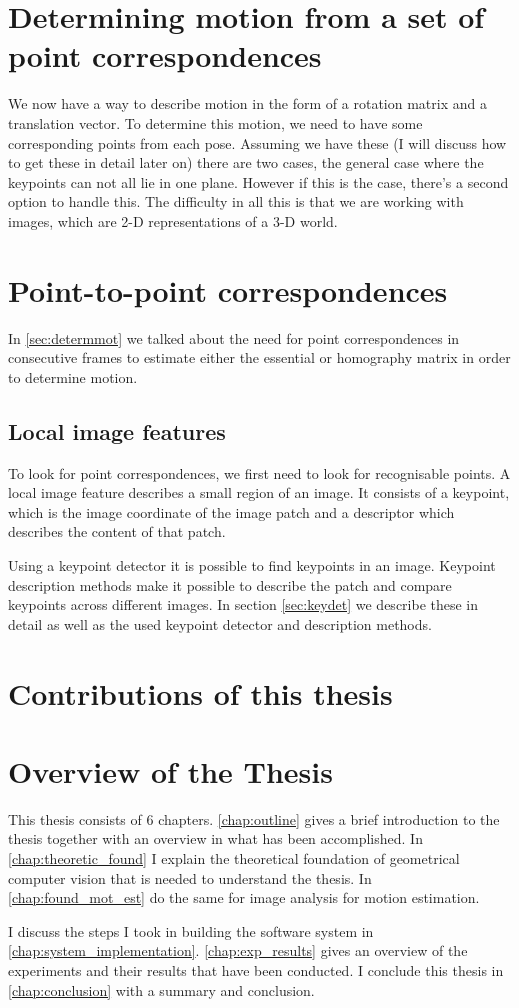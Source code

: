 \section{Determining motion from a set of point correspondences}\label{sec:determmot}
We now have a way to describe motion in the form of a rotation matrix and a translation vector. To determine this motion, we need to have some corresponding points from each pose. Assuming we have these (I will discuss how to get these in detail later on) there are two cases, the general case where the keypoints can not all lie in one plane. However if this is the case, there's a second option to handle this. The difficulty in all this is that we are working with images, which are 2-D representations of a 3-D world. 


\section{Point-to-point correspondences}
In \autoref{sec:determmot} we talked about the need for point correspondences in consecutive frames to estimate either the essential or homography matrix in order to determine motion.\bigskip

\subsection{Local image features}
To look for point correspondences, we first need to look for recognisable points. A local image feature describes a small region of an image. It consists of a keypoint, which is the image coordinate of the image patch and a descriptor which describes the content of that patch.\bigskip

Using a keypoint detector it is possible to find keypoints in an image. Keypoint description methods make it possible to describe the patch and compare keypoints across different images. In section \autoref{sec:keydet} we describe these in detail as well as the used keypoint detector and description methods.

\section{Contributions of this thesis}

\section{Overview of the Thesis}
This thesis consists of 6 chapters. \autoref{chap:outline} gives a brief introduction to the thesis together with an overview in what has been accomplished. In \autoref{chap:theoretic_found} I explain the theoretical foundation of geometrical computer vision that is needed to understand the thesis. In \autoref{chap:found_mot_est} do the same for image analysis for motion estimation.\bigskip

I discuss the steps I took in building the software system in \autoref{chap:system_implementation}. \autoref{chap:exp_results} gives an overview of the experiments and their results that have been conducted. I conclude this thesis in \autoref{chap:conclusion} with a summary and conclusion.
